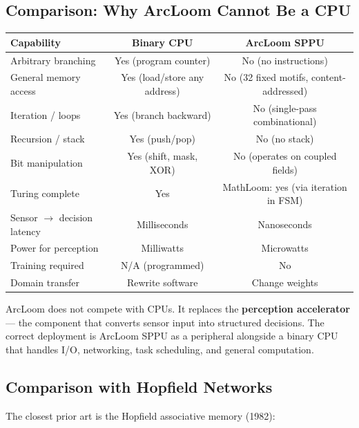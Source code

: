 \documentclass[11pt,a4paper]{article}
\begin{document}
\subsection{Comparison: Why ArcLoom Cannot Be a CPU}

\begin{center}
\begin{tabular}{lcc}
\toprule
\textbf{Capability} & \textbf{Binary CPU} & \textbf{ArcLoom SPPU} \\
\midrule
Arbitrary branching & Yes (program counter) & No (no instructions) \\
General memory access & Yes (load/store any address) & No (32 fixed motifs, content-addressed) \\
Iteration / loops & Yes (branch backward) & No (single-pass combinational) \\
Recursion / stack & Yes (push/pop) & No (no stack) \\
Bit manipulation & Yes (shift, mask, XOR) & No (operates on coupled fields) \\
Turing complete & Yes & MathLoom: yes (via iteration in FSM) \\
\midrule
Sensor $\rightarrow$ decision latency & Milliseconds & Nanoseconds \\
Power for perception & Milliwatts & Microwatts \\
Training required & N/A (programmed) & No \\
Domain transfer & Rewrite software & Change weights \\
\bottomrule
\end{tabular}
\end{center}

ArcLoom does not compete with CPUs. It replaces the \textbf{perception accelerator} --- the component that converts sensor input into structured decisions. The correct deployment is ArcLoom SPPU as a peripheral alongside a binary CPU that handles I/O, networking, task scheduling, and general computation.

\subsection{Comparison with Hopfield Networks}

The closest prior art is the Hopfield associative memory (1982):
\end{document}

